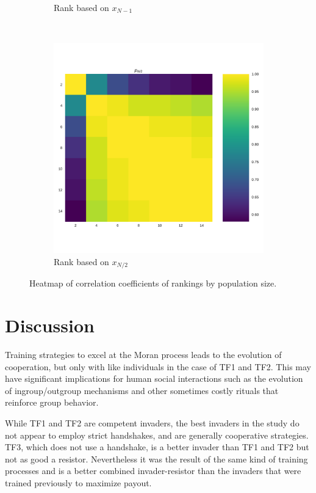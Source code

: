 \documentclass[10pt,journal]{IEEEtran}
\begin{document}
\begin{figure}[!htbp]
\begin{subfigure}[t]{.3\columnwidth}
        \caption{Rank based on \(x_{N - 1}\)}
    \end{subfigure}
    ~
    \begin{subfigure}[t]{.3\columnwidth}
        \centering
        \includegraphics[width=.9\columnwidth]{img/correlation_heatmap_coexist.pdf}
        \caption{Rank based on \(x_{N/2}\)}
    \end{subfigure}
    \caption{Heatmap of correlation coefficients of rankings by population size.}
    \label{fig:correlation_coefficients}
\end{figure}

\section{Discussion}

Training strategies to excel
at the Moran process leads to the evolution of cooperation, but only with like
individuals in the case of TF1 and TF2. This may have significant implications
for human social interactions such as the evolution of ingroup/outgroup mechanisms
and other sometimes costly rituals that reinforce group behavior.

While TF1 and TF2 are competent invaders, the best invaders
in the study do not appear to employ strict handshakes, and are generally
cooperative strategies. TF3, which does not use a handshake, is a better invader
than TF1 and TF2 but not as good a resistor. Nevertheless it was the result
of the same kind of training processes and is a better combined invader-resistor
than the invaders that were trained previously to maximize payout.
\end{document}
